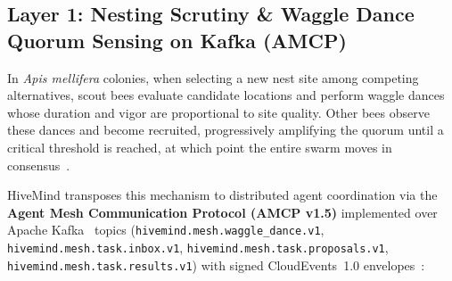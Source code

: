 \documentclass[11pt,a4paper]{article}
\begin{document}
\subsection{Layer 1: Nesting Scrutiny \& Waggle Dance Quorum Sensing on Kafka (AMCP)}
\label{sec:layer1_waggle_dance}

In \textit{Apis mellifera} colonies, when selecting a new nest site among competing alternatives, scout bees evaluate candidate locations and perform waggle dances whose duration and vigor are proportional to site quality. Other bees observe these dances and become recruited, progressively amplifying the quorum until a critical threshold is reached, at which point the entire swarm moves in consensus~\cite{seeley2010honeybee}.

HiveMind transposes this mechanism to distributed agent coordination via the \textbf{Agent Mesh Communication Protocol (AMCP v1.5)} implemented over Apache Kafka~\cite{kreps2011kafka} topics (\texttt{hivemind.mesh.waggle\_dance.v1}, \texttt{hivemind.mesh.task.inbox.v1}, \texttt{hivemind.mesh.task.proposals.v1}, \texttt{hivemind.mesh.task.results.v1}) with signed CloudEvents~1.0 envelopes~\cite{cloudevents2021}:
\end{document}

